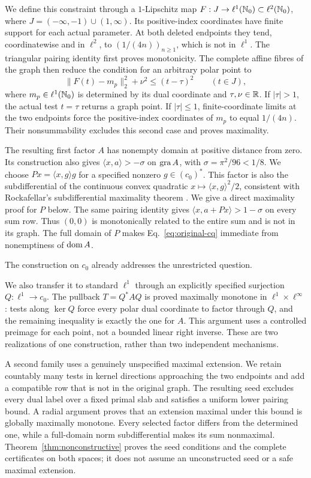 We define this constraint through a $1$-Lipschitz map
$F:J\to\ell^1(\mathbb N_0)\subset\ell^2(\mathbb N_0)$, where
$J=(-\infty,-1)\cup(1,\infty)$. Its positive-index coordinates have finite
support for each actual parameter. At both deleted endpoints they tend,
coordinatewise and in $\ell^2$, to
$(1/(4n))_{n\ge1}$, which is not in $\ell^1$.
The triangular pairing identity first proves monotonicity. The complete
affine fibres of the graph then reduce the condition for an arbitrary
polar point to
\begin{equation}
\|F(t)-m_p\|_2^2+\nu^2\le(t-\tau)^2
\qquad(t\in J),
\label{eq:polar-intro}
\end{equation}
where $m_p\in\ell^1(\mathbb N_0)$ is determined by its dual coordinate and
$\tau,\nu\in\mathbb R$. If $|\tau|>1$, the actual test $t=\tau$ returns a graph
point. If $|\tau|\le1$, finite-coordinate limits at the two endpoints
force the positive-index coordinates of $m_p$ to equal $1/(4n)$.
Their nonsummability excludes this second case and proves maximality.

The resulting first factor $A$ has nonempty domain at positive distance
from zero. Its construction also gives
$\langle x,a\rangle>-\sigma$ on $\operatorname{gra} A$, with
$\sigma=\pi^2/96<1/8$. We choose
$Px=\langle x,g\rangle g$ for a specified nonzero $g\in(c_0)^*$.
This factor is also the subdifferential of the continuous convex quadratic
$x\mapsto\langle x,g\rangle^2/2$, consistent with Rockafellar's
subdifferential maximality theorem \cite{rockafellar1970subdiff}.
We give a direct maximality proof for $P$ below.
The same pairing identity gives
$\langle x,a+Px\rangle>1-\sigma$ on every sum row.
Thus $(0,0)$ is monotonically related to the entire sum and is not in
its graph. The full domain of $P$ makes
Eq.~\eqref{eq:original-cq} immediate from nonemptiness of $\operatorname{dom} A$.

The construction on $c_0$ already addresses the unrestricted question.

We also transfer it to standard $\ell^1$ through an explicitly specified
surjection $Q:\ell^1\to c_0$. The pullback $T=Q^*AQ$ is proved maximally
monotone in $\ell^1\times\ell^\infty$: tests along $\ker Q$ force every
polar dual coordinate to factor through $Q$, and the remaining inequality
is exactly the one for $A$. This argument uses a controlled preimage for
each point, not a bounded linear right inverse.
These are two realizations of one construction, rather than two independent
mechanisms.

A second family uses a genuinely unspecified maximal extension.
We retain countably many tests in kernel directions approaching the two endpoints
and add a compatible row that is not in the original graph. The resulting
seed excludes every dual label over a fixed primal slab and satisfies a
uniform lower pairing bound. A radial argument proves that an extension
maximal under this bound is globally maximally monotone. Every selected
factor differs from the determined one, while a full-domain norm
subdifferential makes its sum nonmaximal. Theorem~\ref{thm:nonconstructive}
proves the seed conditions and the complete certificates on both spaces;
it does not assume an unconstructed seed or a safe maximal extension.

